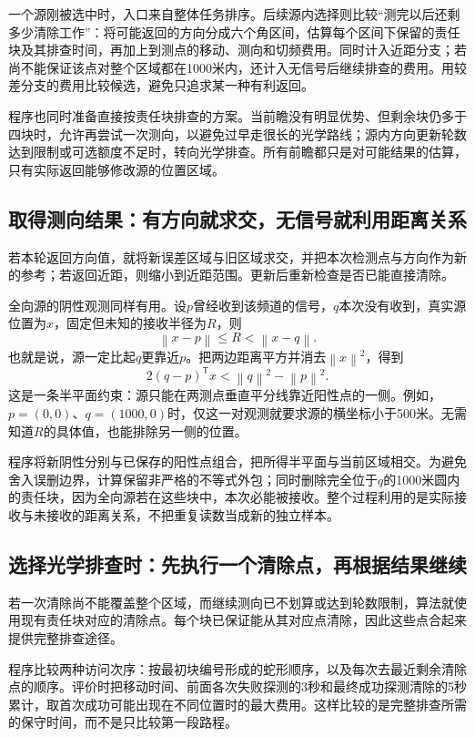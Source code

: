 \documentclass[UTF8,a4paper,12pt,fontset=fandol]{ctexart}
\newcommand{\norm}[1]{\left\lVert#1\right\rVert}
\begin{document}
一个源刚被选中时，入口来自整体任务排序。后续源内选择则比较“测完以后还剩多少清除工作”：将可能返回的方向分成六个角区间，估算每个区间下保留的责任块及其排查时间，再加上到测点的移动、测向和切频费用。同时计入近距分支；若尚不能保证该点对整个区域都在1000米内，还计入无信号后继续排查的费用。用较差分支的费用比较候选，避免只追求某一种有利返回。

程序也同时准备直接按责任块排查的方案。当前瞻没有明显优势、但剩余块仍多于四块时，允许再尝试一次测向，以避免过早走很长的光学路线；源内方向更新轮数达到限制或可选额度不足时，转向光学排查。所有前瞻都只是对可能结果的估算，只有实际返回能够修改源的位置区域。

\subsection{取得测向结果：有方向就求交，无信号就利用距离关系}
若本轮返回方向值，就将新误差区域与旧区域求交，并把本次检测点与方向作为新的参考；若返回近距，则缩小到近距范围。更新后重新检查是否已能直接清除。

全向源的阴性观测同样有用。设$p$曾经收到该频道的信号，$q$本次没有收到，真实源位置为$x$，固定但未知的接收半径为$R$，则
\begin{equation}
\norm{x-p}\le R<\norm{x-q}.
\end{equation}
也就是说，源一定比起$q$更靠近$p$。把两边距离平方并消去$\norm{x}^2$，得到
\begin{equation}\label{eq:omnineg}
2(q-p)^\mathsf T x<\norm q^2-\norm p^2.
\end{equation}
这是一条半平面约束：源只能在两测点垂直平分线靠近阳性点的一侧。例如，$p=(0,0)$、$q=(1000,0)$时，仅这一对观测就要求源的横坐标小于500米。无需知道$R$的具体值，也能排除另一侧的位置。

程序将新阴性分别与已保存的阳性点组合，把所得半平面与当前区域相交。为避免舍入误删边界，计算保留非严格的不等式外包；同时删除完全位于$q$的1000米圆内的责任块，因为全向源若在这些块中，本次必能被接收。整个过程利用的是实际接收与未接收的距离关系，不把重复读数当成新的独立样本。

\subsection{选择光学排查时：先执行一个清除点，再根据结果继续}
若一次清除尚不能覆盖整个区域，而继续测向已不划算或达到轮数限制，算法就使用现有责任块对应的清除点。每个块已保证能从其对应点清除，因此这些点合起来提供完整排查途径。

程序比较两种访问次序：按最初块编号形成的蛇形顺序，以及每次去最近剩余清除点的顺序。评价时把移动时间、前面各次失败探测的3秒和最终成功探测清除的5秒累计，取首次成功可能出现在不同位置时的最大费用。这样比较的是完整排查所需的保守时间，而不是只比较第一段路程。
\end{document}
